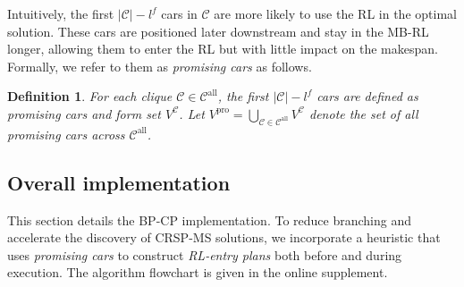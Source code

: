 \documentclass[12pt]{article}
\newtheorem{definition}{Definition}
\begin{document}
\noindent Intuitively, the first $|\mathcal{C}|-l^f$ cars in $\mathcal{C}$ are more likely to use the RL in the optimal solution. These cars are positioned later downstream and stay in the MB-RL longer, allowing them to enter the RL but with little impact on the makespan. Formally, we refer to them as \textit{promising cars} as follows.
\begin{definition}\label{def3}
    For each \textit{clique} $\mathcal{C}\in \mathcal{C}^{\text{all}}$, the first $|\mathcal{C}|-l^f$ cars are defined as \textit{promising cars} and form set $V^{\mathcal{C}}$. %
    Let $V^{\text{pro}}=\bigcup_{\mathcal{C}\in \mathcal{C}^{\text{all}}}{V^{\mathcal{C}}}$ denote the set of all \textit{promising cars} across %
    $\mathcal{C}^{\text{all}}$.
\end{definition}













\subsection{Overall implementation}\label{sec4-6}
This section details the BP-CP implementation. To reduce branching and accelerate the discovery of CRSP-MS solutions, we incorporate a heuristic that uses \textit{promising cars} to construct \textit{RL-entry plans} both before and during execution. The algorithm flowchart is given in the online supplement.
\end{document}
